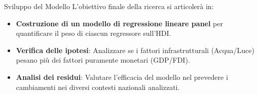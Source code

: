 \documentclass{beamer}
\begin{document}
    \begin{frame}{Sviluppo del Modello}
        L'obiettivo finale della ricerca si articolerà in:
        \begin{itemize}
            \item \textbf{Costruzione di un modello di regressione lineare panel} per quantificare il peso di ciascun regressore sull'HDI.
            \item \textbf{Verifica delle ipotesi}: Analizzare se i fattori infrastrutturali (Acqua/Luce) pesano più dei fattori puramente monetari (GDP/FDI).
            \item \textbf{Analisi dei residui}: Valutare l'efficacia del modello nel prevedere i cambiamenti nei diversi contesti nazionali analizzati.
        \end{itemize}
    \end{frame}
\end{document}
